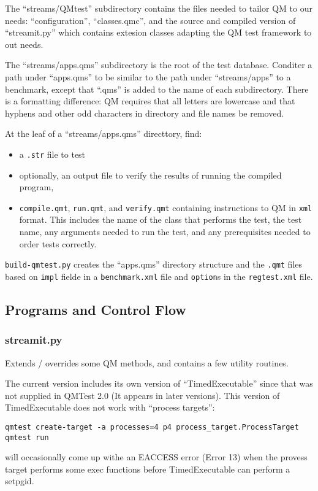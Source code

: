 \documentclass[11pt]{article}
\begin{document}
The ``streams/QMtest'' subdirectory contains the files needed to
tailor QM to our needs:  ``configuration'', ``classes.qmc'', and the
source and compiled version of ``streamit.py'' which contains extesion
classes adapting the QM test framework to out needs.

The ``streams/apps.qms'' subdirectory is the root of the test
database.  Conditer a path under ``apps.qms'' to be similar to the
path under ``streams/apps'' to a benchmark, except that ``.qms'' is
added to the name of each subdirectory.  There is a formatting
difference: QM requires that all letters are lowercase and that
hyphens and other odd characters in directory and file names be
removed.

At the leaf of a  ``streams/apps.qms'' directtory, find: 
\begin{itemize}
\item a {\tt .str} file to test
\item optionally, an output file to verify the results of running the 
compiled program,
\item {\tt compile.qmt}, {\tt run.qmt}, and {\tt verify.qmt}
containing instructions to QM in {\tt xml} format.
This includes the name of the class that performs the test, the test
name, any arguments needed to run the test, and any prerequisites
needed to order tests correctly.
\end{itemize}
{\tt build-qmtest.py} creates the ``apps.qms'' directory structure and
the {\tt .qmt} files based on {\tt impl} fielde in a {\tt benchmark.xml}
file and {\tt option}s in the {\tt regtest.xml} file.

\subsection{Programs and Control Flow}

\subsubsection{streamit.py}
Extends / overrides some QM methods, and contains a few utility routines.

The current version includes its own version of ``TimedExecutable''
since that was not supplied in QMTest 2.0 (It appears in later
versions).  This version of TimedExecutable does not work with
``process targets'':
\begin{verbatim}
qmtest create-target -a processes=4 p4 process_target.ProcessTarget
qmtest run
\end{verbatim}
will occasionally come up withe an EACCESS error (Error 13) when the
provess target performs some exec functions before TimedExecutable can
perform a setpgid.
\end{document}
